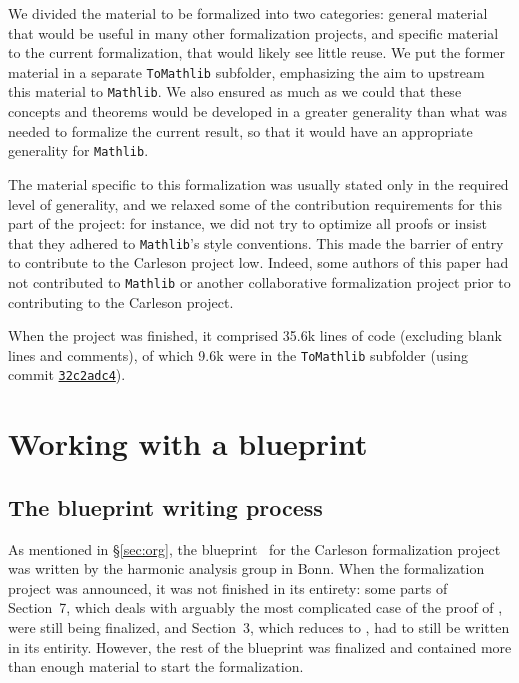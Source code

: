 \documentclass[12pt]{amsart}
\newcommand{\lean}[1]{\lstinline{#1}}
\newcommand{\mathlib}{\texttt{Mathlib}\xspace}
\theoremstyle{definition}
\theoremstyle{plain}
\begin{document}
We divided the material to be formalized into two categories:
general material that would be useful in many other formalization projects,
and specific material to the current formalization, that would likely see little reuse.
We put the former material in a separate \texttt{ToMathlib} subfolder,
emphasizing the aim to upstream this material to \mathlib.
We also ensured as much as we could that these concepts and theorems would be developed in a greater generality than what was needed to formalize the current result, so that it would have an appropriate generality for \mathlib.

The material specific to this formalization was usually stated only in the required level of generality, and we relaxed some of the contribution requirements for this part of the project: for instance, we did not try to optimize all proofs or insist that they adhered to \mathlib's style conventions. This made the barrier of entry to contribute to the Carleson project low.
Indeed, some authors of this paper had not contributed to \mathlib or another collaborative formalization project
prior to contributing to the Carleson project.

When the project was finished, it comprised 35.6k lines of code (excluding blank lines and comments), of which 9.6k were in the \texttt{ToMathlib} subfolder (using commit \texttt{\href{https://github.com/fpvandoorn/carleson/tree/32c2adc411c5c274ed8f19aa8041157e394fa38a}{32c2adc4}}).


\section{Working with a blueprint}\label{sec:blueprint}
\subsection{The blueprint writing process}\label{subsec:blueprint_writing}

As mentioned in \S\ref{sec:org}, the blueprint~\cite{CarlesonBlueprint} for the Carleson formalization project was written
by the harmonic analysis group in Bonn. When the formalization project was announced, it was not finished in its entirety: some parts of Section~7,
which deals with arguably the most complicated case of the proof of ,
were still being finalized, and
Section~3, which reduces  to ,
had to still be written in its entirity.
However, the rest of the blueprint was finalized
and contained more than enough material to start the formalization.
\end{document}
